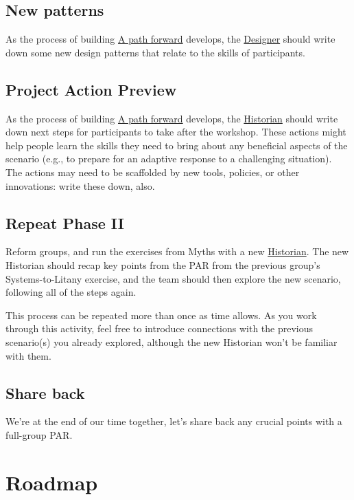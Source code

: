 \documentclass{article}
\begin{document}
\subsection{New patterns}
\label{ed238393-a7e4-4a0d-9eb2-3d6ab745c170}
As the process of building \hyperref[7c0dce3b-d5ea-4712-a771-6ff26f143686]{A path forward} develops, the \hyperref[48a1d6a3-800d-46bd-8a4a-0d3414ecf150]{Designer}
should write down some new design patterns that relate to the skills
of participants.
\subsection{Project Action Preview}
\label{baa168fb-37a0-4144-ab16-d4962728ea9c}
As the process of building \hyperref[7c0dce3b-d5ea-4712-a771-6ff26f143686]{A path forward} develops, the \hyperref[57d46961-a056-435e-85d2-27ab6e0de7f6]{Historian}
should write down next steps for participants to take after the
workshop.  These actions might help people learn the skills they need
to bring about any beneficial aspects of the scenario (e.g., to
prepare for an adaptive response to a challenging situation).  The
actions may need to be scaffolded by new tools, policies, or other
innovations: write these down, also.
\subsection{Repeat Phase II}
\label{092e4fe4-ee4f-494d-8776-c5f1389e8dc0}
Reform groups, and run the exercises from Myths with a new
\hyperref[57d46961-a056-435e-85d2-27ab6e0de7f6]{Historian}. The new Historian should recap key points from the PAR from
the previous group’s Systems-to-Litany exercise, and the team should
then explore the new scenario, following all of the steps again.

This process can be repeated more than once as time allows. As you
work through this activity, feel free to introduce connections with
the previous scenario(s) you already explored, although the new
Historian won’t be familiar with them.
\subsection{Share back}
\label{848c8c3d-cde3-48b4-9dae-23eca4db440d}
We’re at the end of our time together, let’s share back any crucial points with a full-group PAR.

\section{Roadmap}
\label{92e18906-d0e6-4e73-a9cf-fbdad931f3cf}
\end{document}
